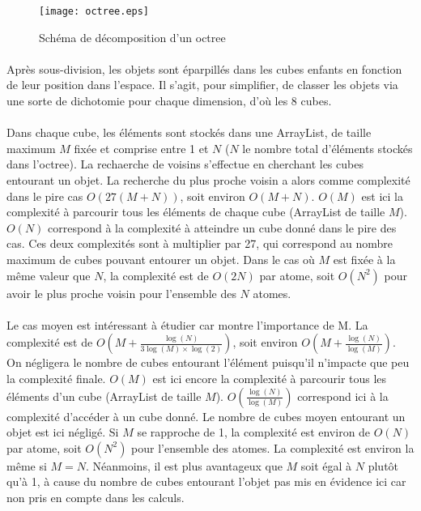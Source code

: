 \begin{figure}[H]
\centering
\centerline{\texttt{[image: octree.eps]}}
\caption{Schéma de décomposition d'un octree}
\label{octree_img}
\end{figure}

\paragraph{}
Après sous-division, les objets sont éparpillés dans les cubes enfants en
fonction de leur position dans l'espace. Il s'agit, pour simplifier, de classer
les objets via une sorte de dichotomie pour chaque dimension, d'où les 8 cubes.

\paragraph{}
Dans chaque cube, les éléments sont stockés dans une ArrayList, de taille
maximum $M$ fixée et comprise entre 1 et $N$ ($N$ le nombre total d'éléments
stockés dans l'octree). La rechaerche de voisins s'effectue en cherchant les
cubes entourant un objet. La recherche du plus proche voisin a alors comme
complexité dans le pire cas $O(27(M + N))$, soit environ $O(M+N)$. $O(M)$ est
ici la complexité à parcourir tous les éléments de chaque cube (ArrayList de
taille $M$). $O(N)$ correspond à la complexité à atteindre un cube donné dans
le pire des cas. Ces deux complexités sont à multiplier par 27, qui correspond
au nombre maximum de cubes pouvant entourer un objet. Dans le cas où $M$ est
fixée à la même valeur que $N$, la complexité est de $O(2N)$ par atome, soit
$O(N^2)$ pour avoir le plus proche voisin pour l'ensemble des $N$ atomes.

\paragraph{}
Le cas moyen est intéressant à étudier car montre l'importance de M. La
complexité est de $O(M + \frac{\log(N)}{3\log(M)\times{}\log(2)})$, soit
environ $O(M + \frac{\log(N)}{\log(M)})$. On négligera le nombre de cubes
entourant l'élément puisqu'il n'impacte que peu la complexité finale. $O(M)$
est ici encore la complexité à parcourir tous les éléments d'un cube (ArrayList
de taille $M$).  $O(\frac{\log(N)}{\log(M)})$ correspond ici à la complexité
d'accéder à un cube donné. Le nombre de cubes moyen entourant un objet est ici
négligé. Si $M$ se rapproche de 1, la complexité est environ de $O(N)$ par
atome, soit $O(N^2)$ pour l'ensemble des atomes. La complexité est environ la
même si $M = N$. Néanmoins, il est plus avantageux que $M$ soit égal à $N$
plutôt qu'à 1, à cause du nombre de cubes entourant l'objet pas mis en
évidence ici car non pris en compte dans les calculs.

